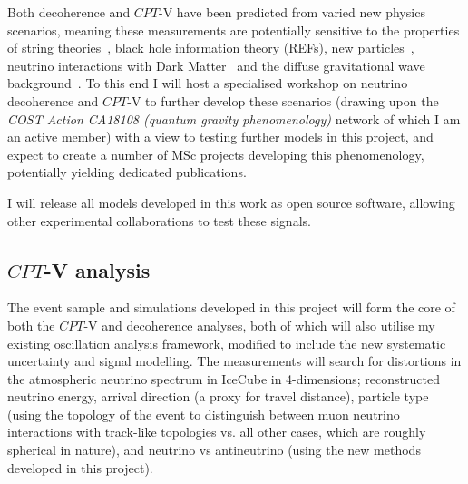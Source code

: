 \documentclass[a4paper,11pt]{article}
\begin{document}
Both decoherence and $CPT$-V have been predicted from varied new physics scenarios, meaning these measurements are potentially sensitive to the properties of string theories~\cite{Mavromatos2010, AmelinoCamelia:2008qg}, black hole information theory (REFs), new particles~\cite{Hellmann:2021jyz}, neutrino interactions with Dark Matter~\cite{1909.11271, EPJC802020, Capozzi:2018bps, 1904.02518} and the diffuse gravitational wave background~\cite{PhysRevD.100.096014}. To this end I will host a specialised workshop on neutrino decoherence and $CPT$-V to further develop these scenarios (drawing upon the \textit{COST Action CA18108 (quantum gravity phenomenology)} network of which I am an active member) with a view to testing further models in this project, and expect to create a number of MSc projects developing this phenomenology, potentially yielding dedicated publications.

I will release all models developed in this work as open source software, allowing other experimental collaborations to test these signals.  \\


\subsection{$CPT$-V analysis}

The event sample and simulations developed in this project will form the core of both the $CPT$-V and decoherence analyses, both of which will also utilise my existing oscillation analysis framework, modified to include the new systematic uncertainty and signal modelling. The measurements will search for distortions in the atmospheric neutrino spectrum in IceCube in 4-dimensions; reconstructed neutrino energy, arrival direction (a proxy for travel distance), particle type (using the topology of the event to distinguish between muon neutrino interactions with track-like topologies vs. all other cases, which are roughly spherical in nature), and neutrino vs antineutrino (using the new methods developed in this project).
\end{document}
